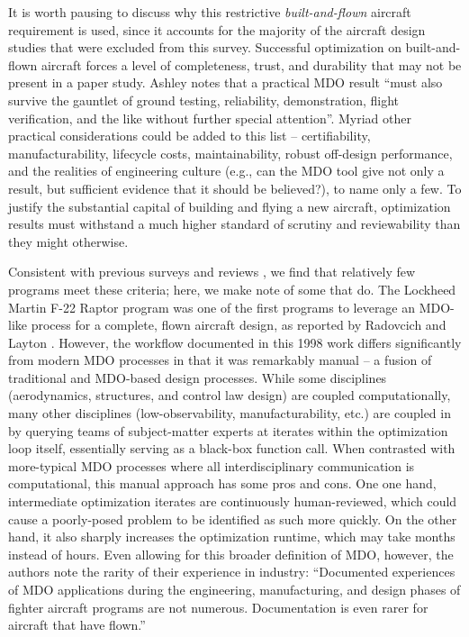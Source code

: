 \noindent It is worth pausing to discuss why this restrictive \textit{built-and-flown} aircraft requirement is used, since it accounts for the majority of the aircraft design studies that were excluded from this survey. Successful optimization on built-and-flown aircraft forces a level of completeness, trust, and durability that may not be present in a paper study. Ashley notes that a practical MDO result ``must also survive the gauntlet of ground testing, reliability, demonstration, flight verification, and the like without further special attention''. \cite{ashley_making_1982} Myriad other practical considerations could be added to this list -- certifiability, manufacturability, lifecycle costs, maintainability, robust off-design performance, and the realities of engineering culture (e.g., can the MDO tool give not only a result, but sufficient evidence that it should be believed?), to name only a few. To justify the substantial capital of building and flying a new aircraft, optimization results must withstand a much higher standard of scrutiny and reviewability than they might otherwise.


Consistent with previous surveys and reviews \cite{kroo_multidisciplinary_1997, agte_mdo_2010, ashley_making_1982, haftka_multidisciplinary_1997,gazaix_industrialization_2017}, we find that relatively few programs meet these criteria; here, we make note of some that do. The Lockheed Martin F-22 Raptor program was one of the first programs to leverage an MDO-like process for a complete, flown aircraft design, as reported by Radovcich and Layton \cite{radovcich_f22_1998}. However, the workflow documented in this 1998 work differs significantly from modern MDO processes in that it was remarkably manual -- a fusion of traditional and MDO-based design processes. While some disciplines (aerodynamics, structures, and control law design) are coupled computationally, many other disciplines (low-observability, manufacturability, etc.) are coupled in by querying teams of subject-matter experts at iterates within the optimization loop itself, essentially serving as a black-box function call. When contrasted with more-typical MDO processes where all interdisciplinary communication is computational, this manual approach has some pros and cons. One one hand, intermediate optimization iterates are continuously human-reviewed, which could cause a poorly-posed problem to be identified as such more quickly. On the other hand, it also sharply increases the optimization runtime, which may take months instead of hours. Even allowing for this broader definition of MDO, however, the authors note the rarity of their experience in industry: ``Documented experiences of MDO applications during the engineering, manufacturing, and design phases of fighter aircraft programs are not numerous. Documentation is even rarer for aircraft that have flown.''

